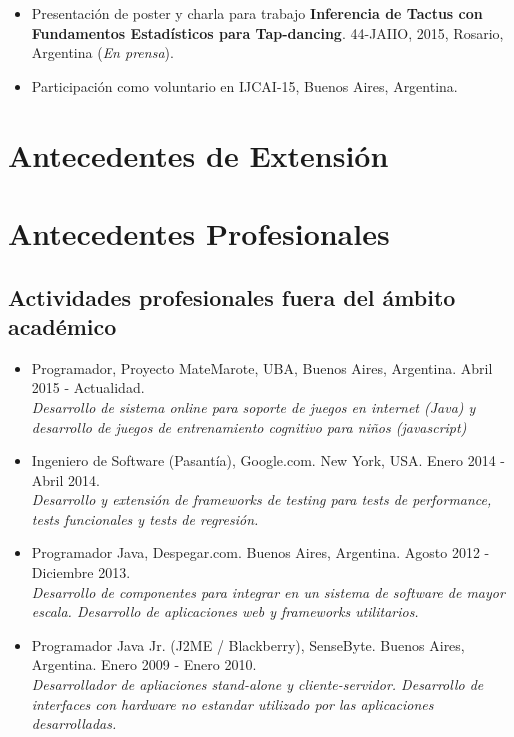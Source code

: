 \documentclass[a4paper,10pt]{article}
\begin{document}
\begin{itemize}
    \item Presentación de poster y charla para trabajo 
\textbf{Inferencia de Tactus con Fundamentos Estadísticos para
Tap-dancing}.\enpublicados{}
44-JAIIO, 2015, Rosario, Argentina (\emph{En prensa}).
    \item Participación como voluntario en IJCAI-15, Buenos Aires, Argentina.
\end{itemize}

\section{Antecedentes de Extensión}

\section{Antecedentes Profesionales}

\subsection{Actividades profesionales fuera del ámbito académico}

\begin{itemize}
    \item {Programador, Proyecto MateMarote, UBA, Buenos Aires, Argentina.
            Abril 2015 - Actualidad. \\
            {\small \itshape Desarrollo de sistema online para soporte de
        juegos en internet (Java) y desarrollo de juegos de entrenamiento
cognitivo para niños (javascript)}}

    \item {Ingeniero de Software (Pasantía), Google.com. New York, USA. Enero
            2014 - Abril 2014. \\ 
    {\small \itshape Desarrollo y extensión de frameworks de testing para tests
de performance, tests funcionales y tests de regresión.}}

    \item {Programador Java, Despegar.com. Buenos Aires, Argentina. Agosto 2012
           - Diciembre 2013. \\
    {\small \itshape Desarrollo de componentes para integrar en un sistema de
software de mayor escala. Desarrollo de aplicaciones web y frameworks
utilitarios.}}

    \item {Programador Java Jr. (J2ME / Blackberry), SenseByte. Buenos Aires,
            Argentina. Enero 2009 - Enero 2010. \\ 
    {\small \itshape Desarrollador de apliaciones stand-alone y
cliente-servidor.  Desarrollo de interfaces con hardware no estandar utilizado
por las aplicaciones desarrolladas.}}

\end{itemize}
\end{document}
